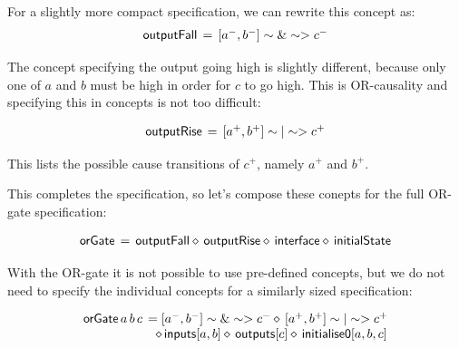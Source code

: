 \documentclass[british, journal]{IEEEtran}
\begin{document}
For a slightly more compact specification, we can rewrite this concept as:
\vspace{-3mm}
\[
\begin{array}{lcl}
\mathsf{outputFall}&\hspace{-2mm}=&\hspace{-2mm}[a^{-}, b^{-}] \sim\&\sim> c^{-} 
\end{array}
\]

\noindent The concept specifying the output going high is slightly different, because only one of
$a$ and $b$ must be high in order for $c$ to go high. This is OR-causality and specifying 
this in concepts is not too difficult: 
                                                                                                                                                                                                                                                                                                                                                        
\vspace{-3mm}
\[
\begin{array}{lcl}
\mathsf{outputRise}&\hspace{-2mm}=&\hspace{-2mm}[a^{+}, b^{+}] \sim|\sim> c^{+} 
\end{array}
\]

\noindent This lists the possible cause transitions of $c^{+}$, namely $a^{+}$ and $b^{+}$. 

This completes the specification, so let's compose these conepts for the full OR-gate
specification:

\vspace{-3mm}
\[
\begin{array}{lcl}
\mathsf{orGate}&\hspace{-2mm}=&\hspace{-2mm}\mathsf{outputFall} \diamond\, \mathsf{outputRise} \diamond\, \mathsf{interface} 
\diamond\, \mathsf{initialState}
\end{array}
\]

\noindent With the OR-gate it is not possible to use pre-defined concepts, but we do not need to
specify the individual concepts for a similarly sized specification:

\vspace{-3mm}
\[
\begin{array}{lcl}
\mathsf{orGate}\,a \,b \,c&\hspace{-2mm}=[a^{-}, b^{-}] \sim\&\sim> c^{-} \diamond\, [a^{+}, b^{+}] \sim|\sim> c^{+} \\
&\diamond\, \mathsf{inputs}[a, b] \diamond\, \mathsf{outputs}[c] \diamond\, \mathsf{initialise0} [a, b, c]
\end{array}
\]
\end{document}
